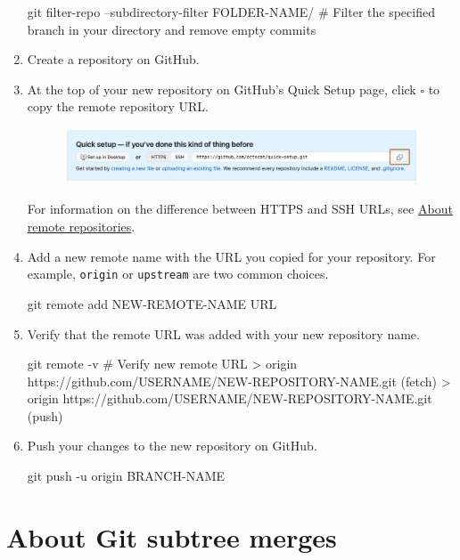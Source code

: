 \begin{enumerate}
    \begin{codeblock}[language=bash]
git filter-repo --subdirectory-filter FOLDER-NAME/
# Filter the specified branch in your directory and remove empty commits
    \end{codeblock}
    \item Create a repository on GitHub.
    \item At the top of your new repository on GitHub's Quick Setup page, click \raisebox{0.3em}{\small$\square$} \hspace{-0.5em} $\square$ to copy the remote repository URL. 
    \begin{figure}[H]
        \centering
        \includegraphics[width=\textwidth]{assets/fig2.png}
    \end{figure}
    \begin{tipsblock}
        For information on the difference between HTTPS and SSH URLs, see \href{https://docs.github.com/en/get-started/git-basics/about-remote-repositories}{About remote repositories}.
    \end{tipsblock}
    \item Add a new remote name with the URL you copied for your repository. For example, \texttt{origin} or \texttt{upstream} are two common choices. 
    \begin{codeblock}[language=bash]
git remote add NEW-REMOTE-NAME URL
    \end{codeblock}
    \item Verify that the remote URL was added with your new repository name.
    \begin{codeblock}[language=bash]
git remote -v
# Verify new remote URL 
> origin  https://github.com/USERNAME/NEW-REPOSITORY-NAME.git (fetch)
> origin  https://github.com/USERNAME/NEW-REPOSITORY-NAME.git (push)
    \end{codeblock}
    \item Push your changes to the new repository on GitHub.
    \begin{codeblock}[language=bash]
git push -u origin BRANCH-NAME
    \end{codeblock}
 \end{enumerate}


 \section{About Git subtree merges}

